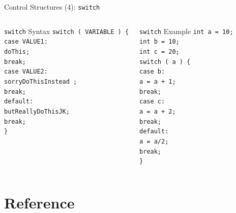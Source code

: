 \documentclass[compress]{beamer}
\newcommand{\tab}{\hspace*{1em}}
\begin{document}
    \begin{frame}{Control Structures (4): \texttt{switch}}
    	\begin{columns}            
    		\column[t]{5cm}
    		\begin{exampleblock}{\texttt{switch} Syntax}
    			\texttt{\small switch ( VARIABLE ) \{ \\
    				\tab case VALUE1: \\
    				\tab \tab doThis; \\
    				\tab \tab break; \\
    				\tab case VALUE2: \\
    				\tab \tab sorryDoThisInstead ; \\
    				\tab \tab break; \\
    				\tab default: \\
    				\tab \tab butReallyDoThisJK; \\
    				\tab \tab break; \\
    				\}
    			}
    		\end{exampleblock}
    		\column[t]{5cm}
    		\begin{exampleblock}{\texttt{switch} Example}
    			\texttt{\small int a = 10; \\
    				int b = 10; \\
    				int c = 20; \\
    				switch ( a ) \{ \\
    				\tab case b: \\
    				\tab \tab a = a + 1; \\
    				\tab \tab break; \\
    				\tab case c: \\
    				\tab \tab a = a + 2; \\
    				\tab \tab break; \\
    				\tab default: \\
    				\tab \tab a = a/2; \\
    				\tab \tab break; \\
    				\}
    			}
    		\end{exampleblock}
    	\end{columns}
    \end{frame}
    
    
    
    
    
    \section{Reference}
\end{document}
